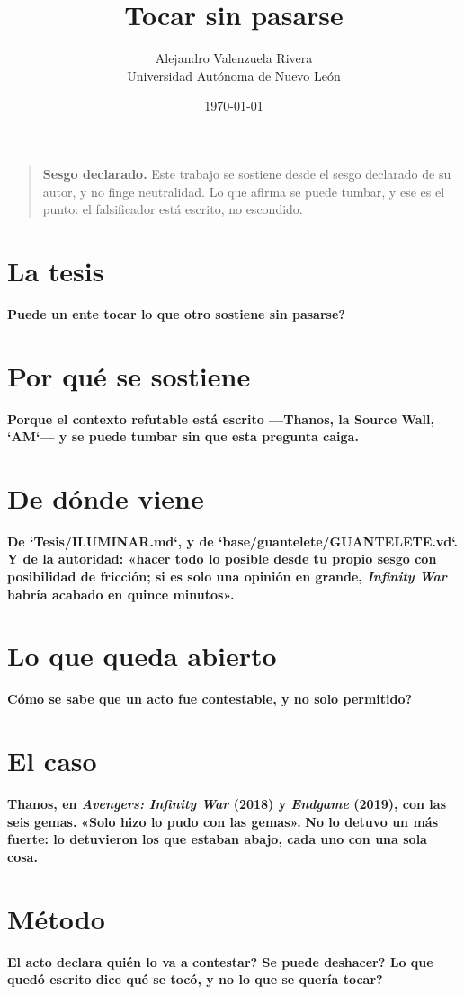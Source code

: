 \documentclass[11pt,a4paper]{article}
\title{Tocar sin pasarse}
\author{Alejandro Valenzuela Rivera\\\small Universidad Autónoma de Nuevo León}
\date{\today}
\begin{document}
\maketitle

\begin{quote}
\textbf{Sesgo declarado.} Este trabajo se sostiene desde el sesgo declarado de su autor, y no finge neutralidad. Lo que afirma se puede tumbar, y ese es el punto: el falsificador está escrito, no escondido.
\end{quote}

\section{La tesis}
\textbf{\textquestiondown{}Puede un ente tocar lo que otro sostiene sin pasarse?}

\section{Por qué se sostiene}
\textbf{Porque el contexto refutable está escrito —Thanos, la Source Wall, `AM`— y se puede tumbar sin que esta pregunta caiga.}

\section{De dónde viene}
\textbf{De `Tesis/ILUMINAR.md`, y de `base/guantelete/GUANTELETE.vd`.} \textbf{Y de la autoridad: «hacer todo lo posible desde tu propio sesgo con posibilidad de fricción; si es solo una opinión en grande, \emph{Infinity War} habría acabado en quince minutos».}

\section{Lo que queda abierto}
\textbf{\textquestiondown{}Cómo se sabe que un acto fue contestable, y no solo permitido?}

\section{El caso}
\textbf{Thanos, en \emph{Avengers: Infinity War} (2018) y \emph{Endgame} (2019), con las seis gemas.} \textbf{«Solo hizo lo pudo con las gemas».} \textbf{No lo detuvo un más fuerte: lo detuvieron los que estaban abajo, cada uno con una sola cosa.}

\section{Método}
\textbf{\textquestiondown{}El acto declara quién lo va a contestar? \textquestiondown{}Se puede deshacer? \textquestiondown{}Lo que quedó escrito dice qué se tocó, y no lo que se quería tocar?}
\end{document}
